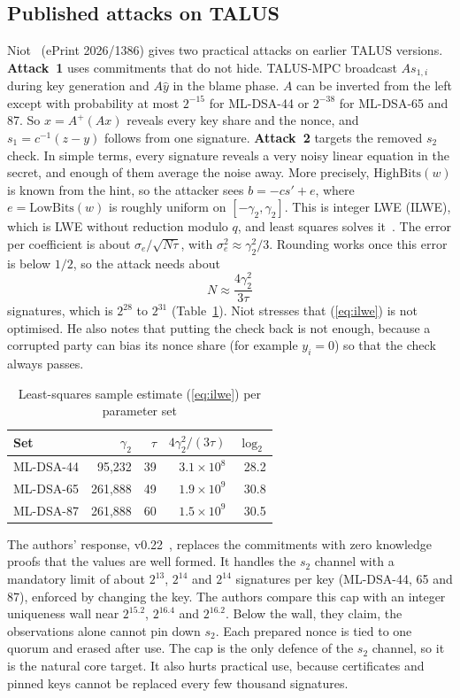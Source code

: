 \documentclass[10pt,conference,a4paper]{IEEEtran}
\newcommand{\HB}{\mathrm{HighBits}}
\newcommand{\LB}{\mathrm{LowBits}}
\begin{document}
\subsection{Published attacks on TALUS}\label{sec:attacks}
Niot~\cite{niot} (ePrint 2026/1386) gives two practical attacks on earlier TALUS versions. \textbf{Attack~1} uses
commitments that do not hide. TALUS-MPC broadcast $As_{1,i}$ during key generation and $A\hat y$ in the blame phase. $A$ can
be inverted from the left except with probability at most $2^{-15}$ for ML-DSA-44 or $2^{-38}$ for ML-DSA-65 and 87. So
$x=A^{+}(Ax)$ reveals every key share and the nonce, and $s_1=c^{-1}(z-y)$ follows from one signature. \textbf{Attack~2}
targets the removed $s_2$ check. In simple terms, every signature reveals a very noisy linear equation in the secret, and
enough of them average the noise away. More precisely, $\HB(w)$ is known from the hint, so the attacker sees $b=-cs'+e$,
where $e=\LB(w)$ is roughly uniform on $[-\gamma_2,\gamma_2]$. This is integer LWE (ILWE), which is LWE without reduction
modulo $q$, and least squares solves it~\cite{ilwe}. The error per coefficient is about $\sigma_e/\sqrt{N\tau}$, with
$\sigma_e^2\approx\gamma_2^2/3$. Rounding works once this error is below $1/2$, so the attack needs about
\begin{equation}
N \approx \frac{4\gamma_2^2}{3\tau}\label{eq:ilwe}
\end{equation}
signatures, which is $2^{28}$ to $2^{31}$ (Table~\ref{tab:ilwe}). Niot stresses that (\ref{eq:ilwe}) is not optimised. He
also notes that putting the check back is not enough, because a corrupted party can bias its nonce share (for example
$y_i=0$) so that the check always passes.

\begin{table}[t]
\caption{Least-squares sample estimate (\ref{eq:ilwe}) per parameter set}\label{tab:ilwe}
\centering\footnotesize
\begin{tabular}{@{}lrrrr@{}}
\toprule
Set & $\gamma_2$ & $\tau$ & $4\gamma_2^2/(3\tau)$ & $\log_2$\\
\midrule
ML-DSA-44 & 95{,}232 & 39 & $3.1\times10^8$ & 28.2\\
ML-DSA-65 & 261{,}888 & 49 & $1.9\times10^9$ & 30.8\\
ML-DSA-87 & 261{,}888 & 60 & $1.5\times10^9$ & 30.5\\
\bottomrule
\end{tabular}
\end{table}

The authors' response, v0.22~\cite{taluspw}, replaces the commitments with zero knowledge proofs that the values are well
formed. It handles the $s_2$ channel with a mandatory limit of about $2^{13}$, $2^{14}$ and $2^{14}$ signatures per key
(ML-DSA-44, 65 and 87), enforced by changing the key. The authors compare this cap with an integer uniqueness wall near
$2^{15.2}$, $2^{16.4}$ and $2^{16.2}$. Below the wall, they claim, the observations alone cannot pin down $s_2$. Each
prepared nonce is tied to one quorum and erased after use. The cap is the only defence of the $s_2$ channel, so it is the
natural core target. It also hurts practical use, because certificates and pinned keys cannot be replaced every few
thousand signatures.
\end{document}

